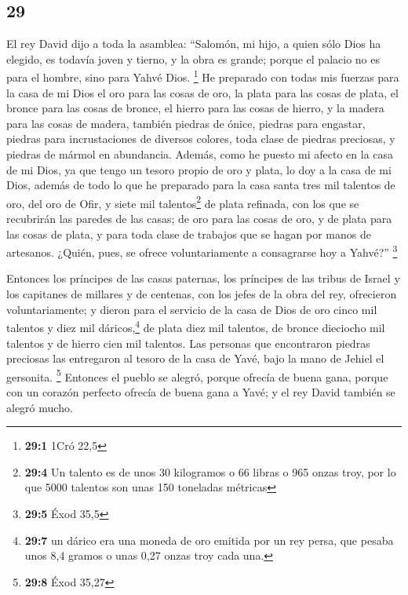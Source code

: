 \begin{paracol}{2}
\hypertarget{section-56}{%
\section{29}\label{section-56}}

 El rey David dijo a toda la asamblea: ``Salomón, mi hijo,
a quien sólo Dios ha elegido, es todavía joven y tierno, y la obra es
grande; porque el palacio no es para el hombre, sino para Yahvé Dios.
\footnote{\textbf{29:1} 1Cró 22,5}  He preparado con todas
mis fuerzas para la casa de mi Dios el oro para las cosas de oro, la
plata para las cosas de plata, el bronce para las cosas de bronce, el
hierro para las cosas de hierro, y la madera para las cosas de madera,
también piedras de ónice, piedras para engastar, piedras para
incrustaciones de diversos colores, toda clase de piedras preciosas, y
piedras de mármol en abundancia.  Además, como he puesto
mi afecto en la casa de mi Dios, ya que tengo un tesoro propio de oro y
plata, lo doy a la casa de mi Dios, además de todo lo que he preparado
para la casa santa  tres mil talentos de oro, del oro de
Ofir, y siete mil talentos\footnote{\textbf{29:4} Un talento es de unos
  30 kilogramos o 66 libras o 965 onzas troy, por lo que 5000 talentos
  son unas 150 toneladas métricas} de plata refinada, con los que se
recubrirán las paredes de las casas;  de oro para las
cosas de oro, y de plata para las cosas de plata, y para toda clase de
trabajos que se hagan por manos de artesanos. ¿Quién, pues, se ofrece
voluntariamente a consagrarse hoy a Yahvé?'' \footnote{\textbf{29:5}
  Éxod 35,5}

 Entonces los príncipes de las casas paternas, los
príncipes de las tribus de Israel y los capitanes de millares y de
centenas, con los jefes de la obra del rey, ofrecieron voluntariamente;
 y dieron para el servicio de la casa de Dios de oro cinco
mil talentos y diez mil dáricos,\footnote{\textbf{29:7} un dárico era
  una moneda de oro emitida por un rey persa, que pesaba unos 8,4 gramos
  o unas 0,27 onzas troy cada una.} de plata diez mil talentos, de
bronce dieciocho mil talentos y de hierro cien mil talentos.
 Las personas que encontraron piedras preciosas las
entregaron al tesoro de la casa de Yavé, bajo la mano de Jehiel el
gersonita. \footnote{\textbf{29:8} Éxod 35,27}  Entonces
el pueblo se alegró, porque ofrecía de buena gana, porque con un corazón
perfecto ofrecía de buena gana a Yavé; y el rey David también se alegró
mucho.


\end{paracol}
